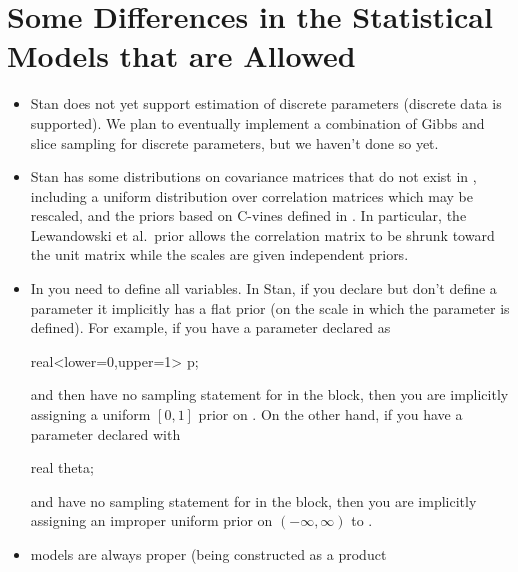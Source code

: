 \section{Some Differences in the Statistical Models that are Allowed}

\begin{itemize}
\item Stan does not yet support estimation of discrete parameters
  (discrete data is supported).  We plan to eventually implement a
  combination of Gibbs and slice sampling for discrete parameters, but
  we haven't done so yet.
\item Stan has some distributions on covariance matrices that do not
  exist in \BUGS, including a uniform distribution over correlation
  matrices which may be rescaled, and the priors based on C-vines
  defined in \citep{LewandowskiKurowickaJoe:2009}.  In particular, the
  Lewandowski et al.\ prior allows the correlation matrix to be shrunk
  toward the unit matrix while the scales are given independent priors.
\item In \BUGS you need to define all variables.  In Stan, if you
  declare but don't define a parameter it implicitly has a flat prior
  (on the scale in which the parameter is defined).  For example, if
  you have a parameter  declared as 
\begin{stancode}
real<lower=0,upper=1> p;
\end{stancode}
%
and then have no sampling statement for  in the 
block, then you are implicitly assigning a uniform $[0,1]$ prior on
.
On the other hand, if you have a parameter  declared with
%
\begin{stancode}
real theta;
\end{stancode}
%
and have no sampling statement for  in the
 block, 
 then you are implicitly assigning an improper uniform prior
on $(-\infty,\infty)$ to .  
%
\item \BUGS models are always proper (being constructed as a product

\end{itemize}
